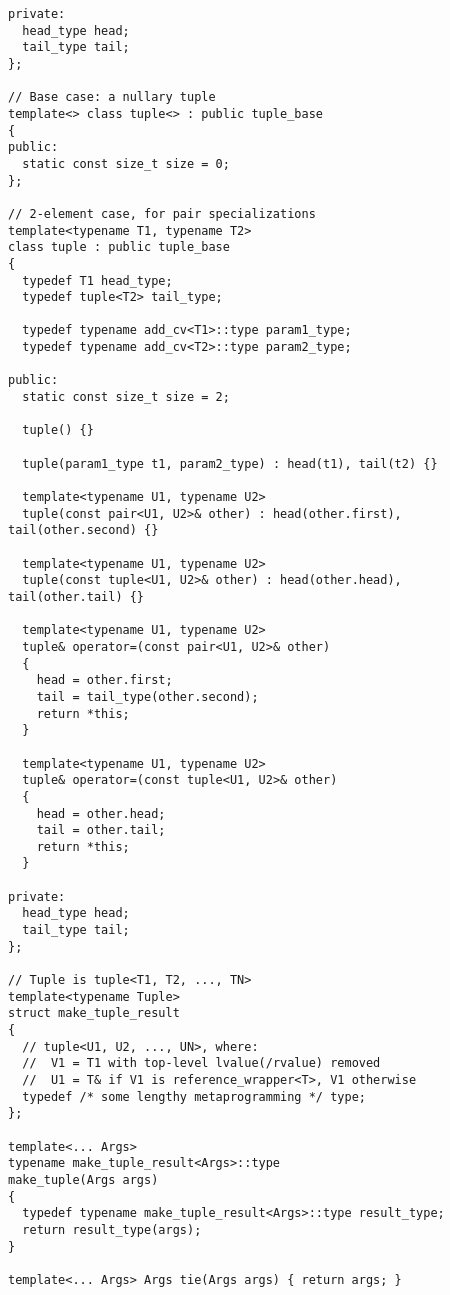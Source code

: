 \documentclass{article}
\begin{document}
\begin{verbatim}
private:
  head_type head;
  tail_type tail;
};

// Base case: a nullary tuple
template<> class tuple<> : public tuple_base 
{
public:
  static const size_t size = 0;
};

// 2-element case, for pair specializations
template<typename T1, typename T2>
class tuple : public tuple_base 
{
  typedef T1 head_type;
  typedef tuple<T2> tail_type;

  typedef typename add_cv<T1>::type param1_type;
  typedef typename add_cv<T2>::type param2_type;

public:
  static const size_t size = 2;

  tuple() {}

  tuple(param1_type t1, param2_type) : head(t1), tail(t2) {}

  template<typename U1, typename U2>
  tuple(const pair<U1, U2>& other) : head(other.first), tail(other.second) {}

  template<typename U1, typename U2>
  tuple(const tuple<U1, U2>& other) : head(other.head), tail(other.tail) {}

  template<typename U1, typename U2>
  tuple& operator=(const pair<U1, U2>& other)
  {
    head = other.first;
    tail = tail_type(other.second);
    return *this;
  }

  template<typename U1, typename U2>
  tuple& operator=(const tuple<U1, U2>& other)
  {
    head = other.head;
    tail = other.tail;
    return *this;
  }

private:
  head_type head;
  tail_type tail;
};

// Tuple is tuple<T1, T2, ..., TN>
template<typename Tuple>
struct make_tuple_result
{
  // tuple<U1, U2, ..., UN>, where:
  //  V1 = T1 with top-level lvalue(/rvalue) removed
  //  U1 = T& if V1 is reference_wrapper<T>, V1 otherwise
  typedef /* some lengthy metaprogramming */ type;
};

template<... Args>
typename make_tuple_result<Args>::type
make_tuple(Args args)
{
  typedef typename make_tuple_result<Args>::type result_type;
  return result_type(args);
}

template<... Args> Args tie(Args args) { return args; }
\end{verbatim}
\normalsize
\end{document}

